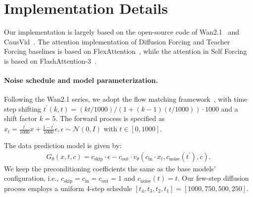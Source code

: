 \appendix

\section{Implementation Details}
\label{app:implementation}

Our implementation is largely based on the open-source code of Wan2.1~\cite{wang2025wan} and CausVid~\cite{yin2025causvid}. The attention implementation of Diffusion Forcing and Teacher Forcing baselines is based on FlexAttention~\cite{Dong2024FlexAA}, while the attention in Self Forcing is based on FlashAttention-3~\cite{shah2024flashattention}.

\paragraph{Noise schedule and model parameterization.}
Following the Wan2.1 series, we adopt the flow matching framework~\cite{lipmanflow, liu2022flow}, with time step shifting $t^\prime(k, t) = (kt / 1000) / (1 + (k-1)(t / 1000)) \cdot 1000$ and a shift factor $k=5$. The forward process is specified as $x_t = \frac{t^\prime}{1000} x + \frac{1 - t^\prime}{1000} \epsilon, \epsilon \sim \mathcal{N}(0, I)$ with $t \in [0, 1000]$.

The data prediction model is given by:
\begin{align}
    G_\theta(x, t, c) = c_{\text{skip}} \cdot \epsilon - c_{\text{out}} \cdot v_\theta(c_{\text{in}} \cdot x_t, c_{\text{noise}}(t^\prime), c).
\end{align}
We keep the preconditioning coefficients the same as the base models' configuration, i.e., $c_{\text{skip}} = c_{\text{in}} = c_{\text{out}} = 1$ and $c_{\text{noise}}(t) = t$.
Our few-step diffusion process employs a uniform 4-step schedule $[t_4, t_3, t_2, t_1]=[1000, 750, 500, 250]$.




